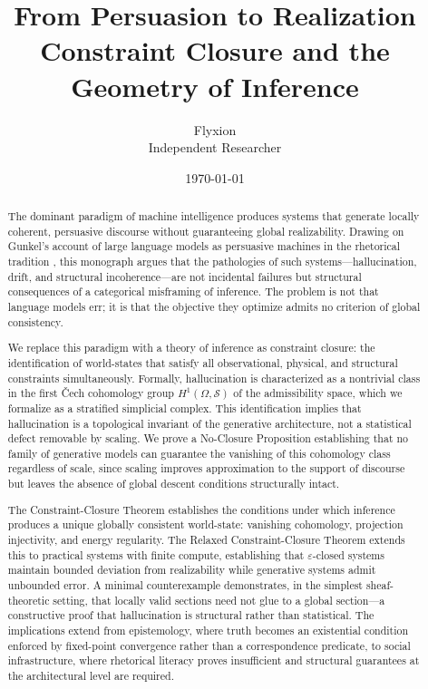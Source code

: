 \documentclass[11pt, oneside]{article}
\title{\textbf{From Persuasion to Realization} \\[0.5em]
\large Constraint Closure and the Geometry of Inference}
\author{Flyxion \\[0.3em]
\normalsize Independent Researcher}
\date{\today}
\begin{document}
\maketitle

\begin{abstract}
The dominant paradigm of machine intelligence produces systems that generate locally coherent, persuasive discourse without guaranteeing global realizability. Drawing on Gunkel's account of large language models as persuasive machines in the rhetorical tradition \cite{gunkel2026}, this monograph argues that the pathologies of such systems---hallucination, drift, and structural incoherence---are not incidental failures but structural consequences of a categorical misframing of inference. The problem is not that language models err; it is that the objective they optimize admits no criterion of global consistency.

We replace this paradigm with a theory of inference as constraint closure: the identification of world-states that satisfy all observational, physical, and structural constraints simultaneously. Formally, hallucination is characterized as a nontrivial class in the first \v{C}ech cohomology group $H^1(\Omega, \mathcal{S})$ of the admissibility space, which we formalize as a stratified simplicial complex. This identification implies that hallucination is a topological invariant of the generative architecture, not a statistical defect removable by scaling. We prove a No-Closure Proposition establishing that no family of generative models can guarantee the vanishing of this cohomology class regardless of scale, since scaling improves approximation to the support of discourse but leaves the absence of global descent conditions structurally intact.

The Constraint-Closure Theorem establishes the conditions under which inference produces a unique globally consistent world-state: vanishing cohomology, projection injectivity, and energy regularity. The Relaxed Constraint-Closure Theorem extends this to practical systems with finite compute, establishing that $\varepsilon$-closed systems maintain bounded deviation from realizability while generative systems admit unbounded error. A minimal counterexample demonstrates, in the simplest sheaf-theoretic setting, that locally valid sections need not glue to a global section---a constructive proof that hallucination is structural rather than statistical. The implications extend from epistemology, where truth becomes an existential condition enforced by fixed-point convergence rather than a correspondence predicate, to social infrastructure, where rhetorical literacy proves insufficient and structural guarantees at the architectural level are required.
\end{abstract}
\end{document}
